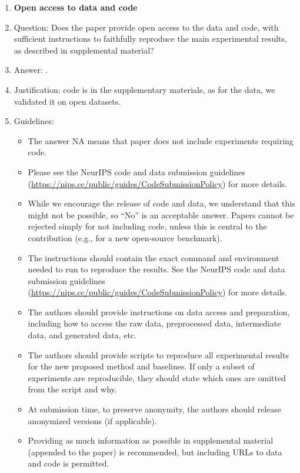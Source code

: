 \documentclass{article}
\begin{document}
{\begin{enumerate}
\item {\bf Open access to data and code}
    \item[] Question: Does the paper provide open access to the data and code, with sufficient instructions to faithfully reproduce the main experimental results, as described in supplemental material?
    \item[] Answer: \answerYes{}.
    \item[] Justification: code is in the supplementary materials, as for the data, we validated it on open datasets.
    \item[] Guidelines:
    \begin{itemize}
        \item The answer NA means that paper does not include experiments requiring code.
        \item Please see the NeurIPS code and data submission guidelines (\url{https://nips.cc/public/guides/CodeSubmissionPolicy}) for more details.
        \item While we encourage the release of code and data, we understand that this might not be possible, so “No” is an acceptable answer. Papers cannot be rejected simply for not including code, unless this is central to the contribution (e.g., for a new open-source benchmark).
        \item The instructions should contain the exact command and environment needed to run to reproduce the results. See the NeurIPS code and data submission guidelines (\url{https://nips.cc/public/guides/CodeSubmissionPolicy}) for more details.
        \item The authors should provide instructions on data access and preparation, including how to access the raw data, preprocessed data, intermediate data, and generated data, etc.
        \item The authors should provide scripts to reproduce all experimental results for the new proposed method and baselines. If only a subset of experiments are reproducible, they should state which ones are omitted from the script and why.
        \item At submission time, to preserve anonymity, the authors should release anonymized versions (if applicable).
        \item Providing as much information as possible in supplemental material (appended to the paper) is recommended, but including URLs to data and code is permitted.
    \end{itemize}



\end{enumerate}}
\end{document}
